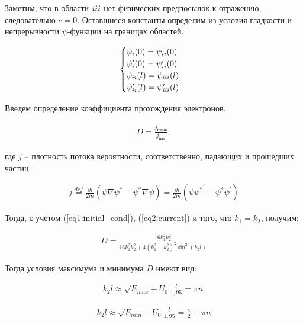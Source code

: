 \documentclass[a4paper,12pt]{article}
\newcommand{\RNumb}[1]{\uppercase\expandafter{\romannumeral #1\relax}}
\begin{document}
Заметим, что в области $\RNumb{3}$ нет физических предпосылок к отражению, следовательно $c=0$. Оставшиеся константы определим из условия гладкости и непрерывности $\psi$-функции на границах областей.

\begin{align} \label{eq1:initial_cond}
	\begin{cases}
		\psi_{\RNumb{1}} (0) = \psi_{\RNumb{2}} (0) \\
		\psi^{\prime}_{\RNumb{1}} (0) = \psi^{\prime}_{\RNumb{2}} (0) \\
		\psi_{\RNumb{2}} (l) = \psi_{\RNumb{3}} (l) \\
		\psi^{\prime}_{\RNumb{2}} (l) = \psi^{\prime}_{\RNumb{3}} (l) \\
	\end{cases}
\end{align}

\newpage

Введем определение коэффициента прохождения электронов.

\begin{align*}
	D = \frac{j_{прош}}{j_{пад}},
\end{align*}

где $j$ -- плотность потока вероятности, соответственно, падающих и прошедших частиц.

\begin{align} \label{eq2:current}
	j \stackrel{def}{=} \frac{i \hbar}{2m} (\psi \nabla \psi^* - \psi^* \nabla \psi) = \frac{i \hbar}{2m} (\psi {\psi^*}^{\prime} - \psi^* \psi^{\prime})
\end{align}

Тогда, с учетом (\ref{eq1:initial_cond}), (\ref{eq2:current}) и того, что $k_1 = k_2$, получим:

\begin{align} \label{eq3:coef_of_transmission}
	D = \frac{16 k_1^2 k_2^2}{16 k_1^2 k_2^2 + 4(k_1^2 - k_2^2)^2 \sin ^2 (k_2 l)} 
\end{align}

Тогда условия максимума и минимума $D$ имеют вид:

\begin{align} \label{eq4:max_energy} 
	k_2 l \approx \sqrt{E_{max} + U_0} \frac{l}{1,95} = \pi n \
\end{align}

\begin{align*}
	k_2 l \approx \sqrt{E_{min} + U_0} \frac{l}{1,95} = \frac{\pi}{2} + \pi n 
\end{align*}
\end{document}
